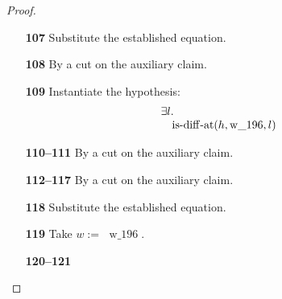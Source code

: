 \documentclass[11pt]{article}
\theoremstyle{plain}
\begin{document}
\begin{proof}
\begin{itemize}[leftmargin=2.8em, itemsep=4pt, parsep=1pt]
  \item[\textbf{107}] Substitute the established equation.
  \item[\textbf{108}] By a cut on the auxiliary claim.
  \item[\textbf{109}] Instantiate the hypothesis:
\begin{equation*}
\begin{array}{@{}l@{}} \exists l. \\ \quad \operatorname{is\text{-}diff\text{-}at}(h, \operatorname{w\_196}, l) \end{array}
\end{equation*}

  \item[\textbf{110--111}] By a cut on the auxiliary claim.
  \item[\textbf{112--117}] By a cut on the auxiliary claim.
  \item[\textbf{118}] Substitute the established equation.
  \item[\textbf{119}] Take $w :=$ $\operatorname{w\_196}$.
  \item[\textbf{120--121}] 
\end{itemize}
\end{proof}
\end{document}
